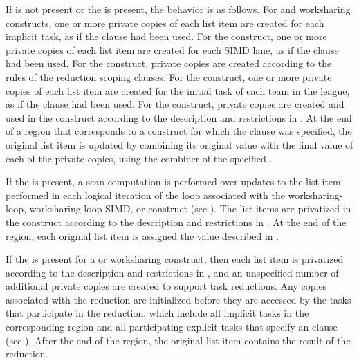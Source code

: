 If  is not present or the 
 is present, the behavior is
as follows. For  and worksharing constructs, one or more
private copies of each list item are created for each implicit task, as if the
 clause had been used. For the  construct, one or
more private copies of each list item are created for each SIMD lane, as if the
 clause had been used.  For the  construct,
private copies are created according to the rules of the reduction scoping
clauses.  For the  construct, one or more private copies of each
list item are created for the initial task of each team in the league, as if
the  clause had been used. For the  construct,
private copies are created and used in the construct according to the 
description and restrictions in . At 
the end of a region that corresponds to a construct for which the  
clause was specified, the original list item is updated by combining its original 
value with the final value of each of the private copies, using the combiner of the
specified . 

If the   is present, a scan computation is
performed over updates to the list item performed in each logical iteration of
the loop associated with the worksharing-loop, worksharing-loop SIMD, or
 construct (see ). The list
items are privatized in the construct according to the description and 
restrictions in . At the end of the region, 
each original list item is assigned the value described in .

If the   is present for a 
or worksharing construct, then each list item is privatized according to the
description and restrictions in , and 
an unspecified number of additional private copies are created to support task 
reductions.  Any copies associated with the reduction are initialized before they 
are accessed by the tasks that participate in the reduction, which include all 
implicit tasks in the corresponding region and all participating explicit tasks 
that specify an  clause (see 
). After the end of the region, the original 
list item contains the result of the reduction.

